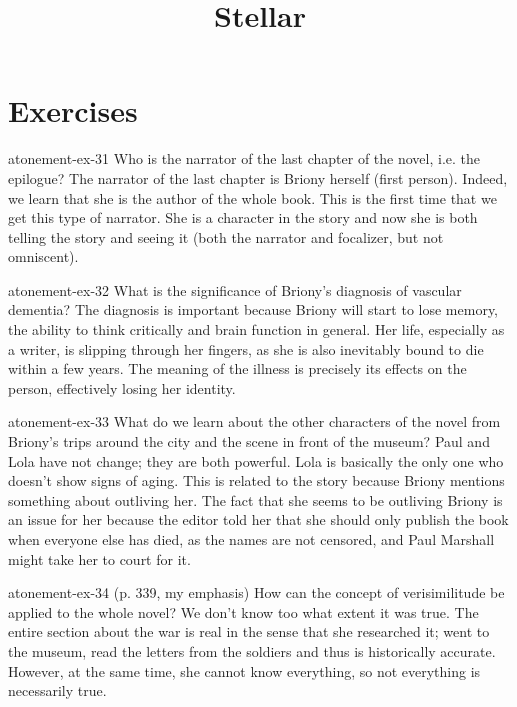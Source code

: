 \documentclass[preview]{standalone}
\begin{document}
\title{Stellar}
\genpage

\section{Exercises}

\begin{snippetexercise}{atonement-ex-31}
    {Who is the narrator of the last chapter of the novel, i.e. the epilogue?}
    The narrator of the last chapter is Briony herself (first person).
    Indeed, we learn that she is the author of the whole book.
    This is the first time that we get this type of narrator.
    She is a character in the story and now she is both telling the story and seeing it
    (both the narrator and focalizer, but not omniscent).
\end{snippetexercise}

\begin{snippetexercise}{atonement-ex-32}
    {What is the significance of Briony's diagnosis of vascular dementia?}
    The diagnosis is important because Briony will start to lose memory, the ability to
    think critically and brain function in general. Her life,
    especially as a writer, is slipping through her fingers,
    as she is also inevitably bound to die within a few years.
    The meaning of the illness is precisely its effects on the person,
    effectively losing her identity.
\end{snippetexercise}

\begin{snippetexercise}{atonement-ex-33}
    {What do we learn about the other characters of the novel from Briony's trips around the city and
    the scene in front of the museum?}
    Paul and Lola have not change; they are both powerful.
    Lola is basically the only one who doesn't show signs of aging.
    This is related to the story because Briony mentions something about outliving her.
    The fact that she seems to be outliving Briony is an issue for her because
    the editor told her that she should only publish the book when everyone else has died,
    as the names are not censored, and Paul Marshall might take her to court for it.
\end{snippetexercise}

\begin{snippetexercise}{atonement-ex-34}
    { (p. 339, my emphasis) How can the concept of verisimilitude
    be applied to the whole novel?}
    We don't know too what extent it was true.
    The entire section about the war is real in the sense that she researched it;
    went to the museum, read the letters from the soldiers and thus is historically accurate.
    However, at the same time, she cannot know everything, so not everything is necessarily true.
\end{snippetexercise}
\end{document}
